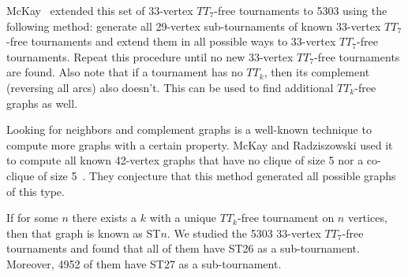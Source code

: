 \documentclass[conference]{IEEEtran}
\begin{document}
McKay~\cite{McKay} extended this set of 33-vertex $TT_7$-free tournaments to 5303 using the following method: generate all 29-vertex sub-tournaments of known 33-vertex $TT_7$-free tournaments and extend them in all possible ways to 33-vertex $TT_7$-free tournaments. Repeat this procedure until no new 33-vertex $TT_7$-free tournaments are found. Also note that if a tournament has no $TT_k$, then its complement (reversing all arcs) also doesn't. This can be used to find additional $TT_k$-free graphs as well. 

Looking for neighbors and complement graphs is a well-known technique to compute more graphs with a certain property. McKay and Radziszowski used it to compute all known 42-vertex graphs that have no clique of size 5 nor a co-clique of size 5~\cite{McKay1997}. They conjecture that this method generated all possible graphs of this type. 

If for some $n$ there exists a $k$ with a unique $TT_k$-free tournament on $n$ vertices, then that graph is known as ST$n$. We studied the 5303 33-vertex $TT_7$-free tournaments and
found that all of them have ST26 as a sub-tournament. Moreover, 4952 of them have ST27 as a sub-tournament. 

%
%
\end{document}
